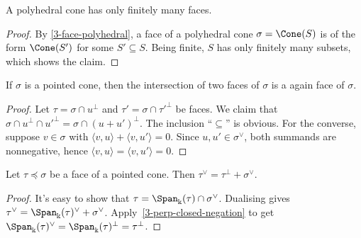 \begin{lemma}
  \label{3-faces-polyhedral-cone-finite}
  A polyhedral cone has only finitely many faces.
\end{lemma}
\begin{proof}
  \uses{}
  By \ref{3-face-polyhedral}, a face of a polyhedral cone \( \sigma =
  \Cone(S) \) is of the form \( \Cone(S') \) for some \( S' \subseteq
  S \). Being finite, \( S \) has only finitely many subsets, which
  shows the claim.
\end{proof}


\begin{lemma}
  \label{3-face-intersection}
  If \( \sigma \) is a pointed cone, then the intersection of two
  faces of \( \sigma \) is a again face of \( \sigma \).
\end{lemma}
\begin{proof}
  \uses{}
  Let \( \tau = \sigma \cap u^{\perp} \) and \( \tau' = \sigma \cap
  \tau'^{\perp} \) be faces. We claim that \( \sigma \cap u^{\perp}
  \cap u'^{\perp} = \sigma \cap (u + u')^{\perp} \). The inclusion
  ``\( \subseteq \)'' is obvious. For the converse, suppose \( v \in
  \sigma \) with \( \langle v, u \rangle + \langle v, u' \rangle = 0
  \). Since \( u, u' \in \sigma^{\vee} \), both summands are
  nonnegative, hence \( \langle v, u \rangle = \langle v, u' \rangle =
  0 \).
\end{proof}

\begin{lemma}[]
  \label{3-face-dual-eq-sum}
  Let \( \tau \preceq \sigma \) be a face of a pointed cone. Then \(
  \tau^{\vee} = \tau^{\perp} + \sigma^{\vee} \).
\end{lemma}
\begin{proof}
  It's easy to show that \( \tau = \Span_{\Bbbk}(\tau) \cap
  \sigma^{\vee} \). Dualising gives \( \tau^{\vee} =
  \Span_{\Bbbk}(\tau)^{\vee} + \sigma^{\vee} \).
  Apply~\ref{3-perp-closed-negation} to get \(
  \Span_{\Bbbk}(\tau)^{\vee} = \Span_{\Bbbk}(\tau)^{\perp} =
  \tau^{\perp} \).
\end{proof}



